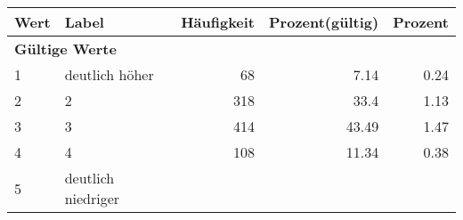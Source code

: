      \begin{longtable}{lXrrr}
     \toprule
     \textbf{Wert} & \textbf{Label} & \textbf{Häufigkeit} & \textbf{Prozent(gültig)} & \textbf{Prozent} \\
     \endhead
     \midrule
     \multicolumn{5}{l}{\textbf{Gültige Werte}}\\

     1 &
     \multicolumn{1}{X}{ deutlich höher   } &


       \num{68} &
       \num[round-mode=places,round-precision=2]{7.14} &
         \num[round-mode=places,round-precision=2]{0.24} \\

     2 &
     \multicolumn{1}{X}{ 2   } &


       \num{318} &
       \num[round-mode=places,round-precision=2]{33.4} &
         \num[round-mode=places,round-precision=2]{1.13} \\

     3 &
     \multicolumn{1}{X}{ 3   } &


       \num{414} &
       \num[round-mode=places,round-precision=2]{43.49} &
         \num[round-mode=places,round-precision=2]{1.47} \\

     4 &
     \multicolumn{1}{X}{ 4   } &


       \num{108} &
       \num[round-mode=places,round-precision=2]{11.34} &
         \num[round-mode=places,round-precision=2]{0.38} \\

     5 &
     \multicolumn{1}{X}{ deutlich niedriger   } &



\end{longtable}
